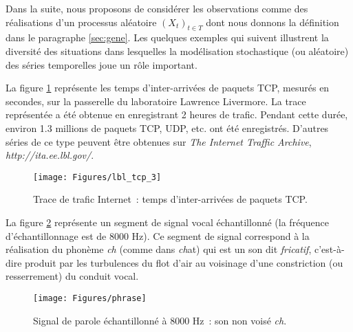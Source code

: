 Dans la suite, nous proposons de consid\'erer les observations comme
des r\'ealisations d'un processus al\'eatoire $(X_t)_{t\in T}$ dont nous
donnons la d\'efinition dans le paragraphe \ref{sec:gene}. Les quelques
exemples qui suivent illustrent la diversit\'e des situations dans
lesquelles la mod\'elisation stochastique (ou al\'eatoire) des s\'eries
temporelles joue un r\^ole important.
\begin{example}
La figure \ref{fig:figtraf} repr\'esente les temps d'inter-arriv\'ees
de paquets TCP, mesur\'es en secondes, sur la passerelle du
laboratoire Lawrence Livermore. La trace repr\'esent\'ee a \'et\'e obtenue
en enregistrant 2 heures de trafic. Pendant cette dur\'ee, environ
1.3 millions de paquets TCP, UDP, etc. ont \'et\'e enregistr\'es.
D'autres s\'eries de ce type peuvent \^{e}tre obtenues sur
\emph{The Internet Traffic Archive},
\emph{http://ita.ee.lbl.gov/}.
\begin{figure}
  \centering
  \texttt{[image: Figures/lbl\_tcp\_3]}\\
  \caption{Trace de trafic Internet~: temps d'inter-arriv\'ees de paquets TCP.}\label{fig:figtraf}
\end{figure}
\end{example}
\begin{example}[Parole]
La figure \ref{fig:figspeech} repr\'esente un segment de signal
vocal \'echantillonn\'e (la fr\'equence d'\'echantillonnage est de 8000
Hz). Ce segment de signal correspond \`a la r\'ealisation du
phon\`eme \emph{ch} (comme dans \emph{ch}at) qui est un son
dit \emph{fricatif}, c'est-\`a-dire produit par les turbulences du
flot d'air au voisinage d'une constriction (ou resserrement) du
conduit vocal.
\begin{figure}
  \centering
  \texttt{[image: Figures/phrase]}\\
  \caption{Signal de parole \'echantillonn\'e \`a $8000$ Hz~:
 son non vois\'e \emph{ch}.}\label{fig:figspeech}
\end{figure}
\end{example}

